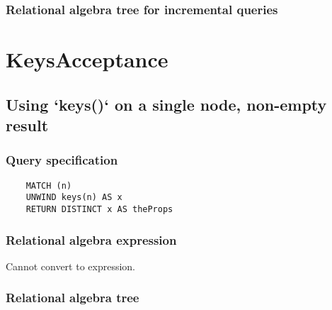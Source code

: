 	\subsubsection*{Relational algebra tree for incremental queries}


	\section{KeysAcceptance}

	\subsection{Using `keys()` on a single node, non-empty result}

	\subsubsection*{Query specification}

	\begin{lstlisting}
	MATCH (n)
	UNWIND keys(n) AS x
	RETURN DISTINCT x AS theProps
	\end{lstlisting}


	\subsubsection*{Relational algebra expression}

	Cannot convert to expression.

	\subsubsection*{Relational algebra tree}

